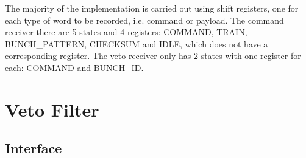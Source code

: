 \documentclass[]{article}
\begin{document}
  The majority of the implementation is carried out using shift registers, one for each type of word to be recorded, i.e. command or payload. The command receiver there are 5 states and 4 registers: COMMAND, TRAIN, BUNCH\_PATTERN, CHECKSUM and IDLE, which does not have a corresponding register. The veto receiver only has 2 states with one register for each: COMMAND and BUNCH\_ID. 
  
  
  \section{Veto Filter} %
  \label{sec:veto_filter}
  \subsection{Interface} %
  \label{sub:veto_interface}
  
\end{document}
